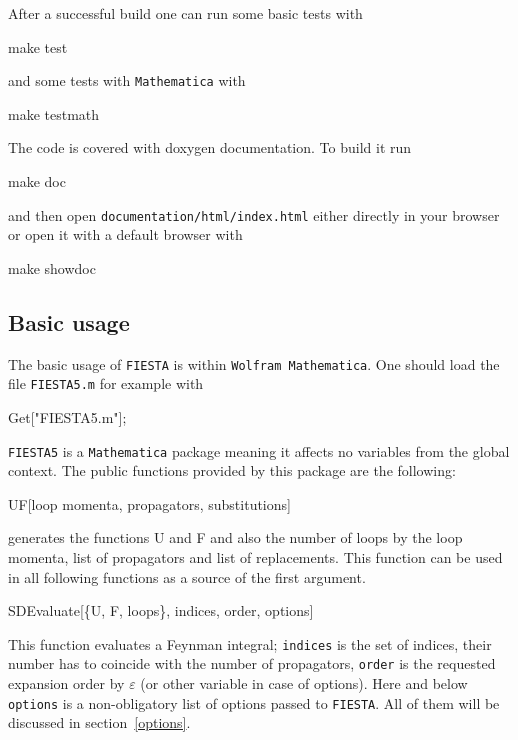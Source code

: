 \documentclass[preprint,12pt]{elsarticle}
\newcommand{\ep}{\varepsilon}
\newenvironment{code}
  {\tt\noindent\begin{framed}\begin{flushleft}}
  {\end{flushleft}\end{framed}\normalfont}
\begin{document}
After a successful build one can run some basic tests with

\begin{code} 
make test 
\end{code}

\noindent and some tests with {\tt Mathematica} with

\begin{code} 
make testmath
\end{code}

The code is covered with doxygen documentation. To build it run

\begin{code} 
make doc
\end{code}

\noindent and then open {\tt documentation/html/index.html} either directly in your browser or open it with a default browser with

\begin{code} 
make showdoc
\end{code}

\subsection{Basic usage}

The basic usage of {\tt FIESTA} is within {\tt Wolfram Mathematica}. One should load the file {\tt FIESTA5.m} for example with 

\begin{code}
 Get["FIESTA5.m"];
\end{code}

{\tt FIESTA5} is a {\tt Mathematica} package meaning it affects no variables from the global context. The public functions provided by this package are the following:

\begin{code}
UF[loop momenta, propagators, substitutions] 
\end{code}

\noindent generates the functions U and F and also the number of loops by the loop momenta, list of propagators and list of replacements. This function can be used in all following functions as a source of the first argument.

\begin{code}
SDEvaluate[\{U, F, loops\}, indices, order, options]
\end{code}

This function evaluates a Feynman integral; {\tt indices} is the set of indices, their number has to coincide with the number of propagators, {\tt order} is the requested expansion order by $\ep$ (or other variable in case of options). Here and below {\tt options} is a non-obligatory list of options passed to {\tt FIESTA}. All of them will be discussed in section~\ref{options}.
\end{document}
